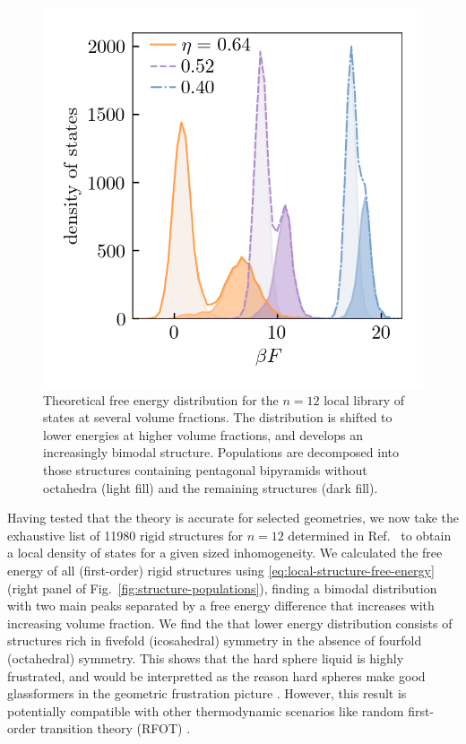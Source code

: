 \documentclass[11pt,twoside]{report}
\begin{document}
\begin{figure}
  \includegraphics[width=0.9\linewidth,outer]{n12-dos}
  \caption[Free energy distribution of 12 particle structures]{
    Theoretical free energy distribution for the $n=12$ local library of states at several volume fractions.
    The distribution is shifted to lower energies at higher volume fractions, and develops an increasingly bimodal structure.
    Populations are decomposed into those structures containing pentagonal bipyramids without octahedra (light fill) and the remaining structures (dark fill).
  }
  \label{fig:n12-dos}
\end{figure}

Having tested that the theory is accurate for selected geometries, we now take the exhaustive list of 11980 rigid structures for $n=12$ determined in Ref.\ \cite{Holmes-CerfonSR2016} to obtain a local density of states for a given sized inhomogeneity.
We calculated the free energy of all (first-order) rigid structures using \eqref{eq:local-structure-free-energy} (right panel of Fig.\ \ref{fig:structure-populations}), finding a bimodal distribution with two main peaks separated by a free energy difference that increases with increasing volume fraction.
We find the that lower energy distribution consists of structures rich in fivefold (icosahedral) symmetry in the absence of fourfold (octahedral) symmetry.
This shows that the hard sphere liquid is highly frustrated, and would be interpretted as the reason hard spheres make good glassformers in the geometric frustration picture \cite{KivelsonPA1995,TarjusJPCM2005}.
However, this result is potentially compatible with other thermodynamic scenarios like random first-order transition theory (RFOT) \cite{LubchenkoARPC2007}.
\end{document}
